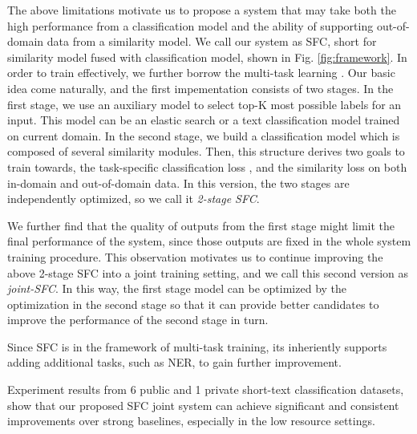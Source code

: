 The above limitations motivate us to propose a system that may take both the high performance from a classification model and the ability of supporting out-of-domain data from a similarity model.
We call our system as SFC, short for similarity model fused with classification model, shown in Fig. \ref{fig:framework}. 
In order to train effectively, we further borrow the multi-task learning \cite{caruana1993multitask,collobert2008unified, liu2019multi}.
Our basic idea come naturally, and the first impementation consists of two stages. 
In the first stage, we use an auxiliary model to select top-K most possible labels for an input. 
This model can be an elastic search \cite{divya2013elasticsearch} or a text classification model trained on current domain. 
In the second stage, we build a classification model which is composed of several similarity modules. 
Then, this structure derives two goals to train towards, the task-specific classification loss , and the similarity loss on both in-domain and out-of-domain data. 
In this version, the two stages are independently optimized, so we call it \emph{2-stage SFC}. 

We further find that the quality of outputs from the first stage might limit the final performance of the system, since those outputs are fixed in the whole system training procedure. 
This observation motivates us to continue improving the above 2-stage SFC into a joint training setting, and we call this second version as \emph{joint-SFC}. 
In this way, the first stage model can be optimized by the optimization in the second stage so that it can provide better candidates to improve the performance of the second stage in turn.

Since SFC is in the framework of multi-task training, its inheriently supports adding additional tasks, such as NER, to gain further improvement.

Experiment results from 6 public and 1 private short-text classification datasets, show that our proposed SFC joint system can achieve significant and consistent improvements over strong baselines, especially in the low resource settings.

